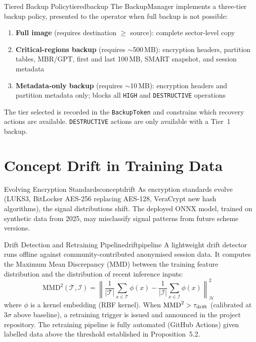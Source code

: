 \documentclass[11pt,a4paper]{report}
\begin{document}
\begin{solution}{Tiered Backup Policy}{tieredbackup}
The BackupManager implements a three-tier backup policy, presented to the operator when full backup is not possible:
\begin{enumerate}[noitemsep]
  \item \textbf{Full image} (requires destination $\geq$ source): complete sector-level copy
  \item \textbf{Critical-regions backup} (requires $\sim$500\,MB): encryption headers, partition tables, MBR/GPT, first and last 100\,MB, SMART snapshot, and session metadata
  \item \textbf{Metadata-only backup} (requires $\sim$10\,MB): encryption headers and partition metadata only; blocks all \texttt{HIGH} and \texttt{DESTRUCTIVE} operations
\end{enumerate}
The tier selected is recorded in the \texttt{BackupToken} and constrains which recovery actions are available. \texttt{DESTRUCTIVE} actions are only available with a Tier~1 backup.
\end{solution}

\section{Concept Drift in Training Data}

\begin{edgecase}{Evolving Encryption Standards}{conceptdrift}
As encryption standards evolve (LUKS3, BitLocker AES-256 replacing AES-128, VeraCrypt new hash algorithms), the signal distributions shift. The deployed ONNX model, trained on synthetic data from 2025, may misclassify signal patterns from future scheme versions.
\end{edgecase}

\begin{solution}{Drift Detection and Retraining Pipeline}{driftpipeline}
A lightweight drift detector runs offline against community-contributed anonymised session data. It computes the Maximum Mean Discrepancy (MMD) between the training feature distribution and the distribution of recent inference inputs:
\[
  \mathrm{MMD}^2(\mathcal{T}, \mathcal{I}) = \left\| \frac{1}{|\mathcal{T}|}\sum_{x \in \mathcal{T}} \phi(x) - \frac{1}{|\mathcal{I}|}\sum_{x \in \mathcal{I}} \phi(x) \right\|_{\mathcal{H}}^2
\]
where $\phi$ is a kernel embedding (RBF kernel). When $\mathrm{MMD}^2 > \tau_{\rm drift}$ (calibrated at $3\sigma$ above baseline), a retraining trigger is issued and announced in the project repository. The retraining pipeline is fully automated (GitHub Actions) given labelled data above the threshold established in Proposition~5.2.
\end{solution}
\end{document}
